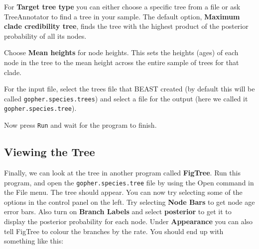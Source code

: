 \documentclass[12pt]{article}
\begin{document}
For {\bf Target tree type} you can either choose a specific tree from a file or ask TreeAnnotator to find a tree in your sample.
The default option, {\bf Maximum clade credibility tree}, finds the tree with the highest product of the posterior probability of
all its nodes.

Choose {\bf Mean heights} for node heights. This sets the heights (ages) of each node in the tree to the mean height across the
entire sample of trees for that clade.

For the input file, select the trees file that BEAST created (by default this will be called \texttt{gopher.species.trees}) and select a file for the
output (here we called it \texttt{gopher.species.tree}).

Now press \texttt{Run} and wait for the program to finish.

\subsection*{Viewing the Tree}
Finally, we can look at the tree in another program called {\bf FigTree}. Run this program, and open
the \texttt{gopher.species.tree} file by using the Open command in the File menu. The tree should appear.
You can now try selecting some of the options in the control panel on the left. Try selecting
{\bf Node Bars} to get node age error bars. Also turn on {\bf Branch Labels} and select {\bf posterior} to get
it to display the posterior probability for each node. Under {\bf Appearance} you can also tell FigTree
to colour the branches by the rate.
You should end up with something like this:

\medskip{}

\end{document}
